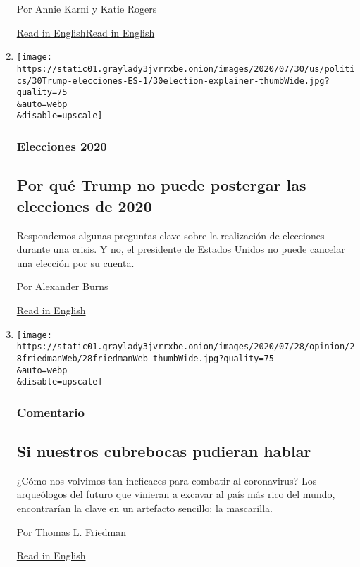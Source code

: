 \begin{enumerate}
  Por Annie Karni y Katie Rogers

  \href{https://www.nytimes3xbfgragh.onion/2020/07/28/us/politics/donald-fred-trump.html}{Read
  in
  English}\href{https://www.nytimes3xbfgragh.onion/2020/07/28/us/politics/donald-fred-trump.html}{Read
  in English}
\item
  \href{/es/2020/07/30/espanol/estados-unidos/trump-retrasar-elecciones.html}{}

  \texttt{[image: https://static01.graylady3jvrrxbe.onion/images/2020/07/30/us/politics/30Trump-elecciones-ES-1/30election-explainer-thumbWide.jpg?quality=75\\\&auto=webp\\\&disable=upscale]}

  \hypertarget{elecciones-2020}{%
  \subsubsection{Elecciones 2020}\label{elecciones-2020}}

  \hypertarget{por-quuxe9-trump-no-puede-postergar-las-elecciones-de-2020}{%
  \subsection{Por qué Trump no puede postergar las elecciones de
  2020}\label{por-quuxe9-trump-no-puede-postergar-las-elecciones-de-2020}}

  Respondemos algunas preguntas clave sobre la realización de elecciones
  durante una crisis. Y no, el presidente de Estados Unidos no puede
  cancelar una elección por su cuenta.

  Por Alexander Burns

  \href{https://www.nytimes3xbfgragh.onion/2020/07/30/us/politics/trump-postpone-election.html}{Read
  in English}
\item
  \href{/es/2020/07/30/espanol/opinion/usar-cubrebocas-politica.html}{}

  \texttt{[image: https://static01.graylady3jvrrxbe.onion/images/2020/07/28/opinion/28friedmanWeb/28friedmanWeb-thumbWide.jpg?quality=75\\\&auto=webp\\\&disable=upscale]}

  \hypertarget{comentario-2}{%
  \subsubsection{Comentario}\label{comentario-2}}

  \hypertarget{si-nuestros-cubrebocas-pudieran-hablar}{%
  \subsection{Si nuestros cubrebocas pudieran
  hablar}\label{si-nuestros-cubrebocas-pudieran-hablar}}

  ¿Cómo nos volvimos tan ineficaces para combatir al coronavirus? Los
  arqueólogos del futuro que vinieran a excavar al país más rico del
  mundo, encontrarían la clave en un artefacto sencillo: la mascarilla.

  Por Thomas L. Friedman

  \href{https://www.nytimes3xbfgragh.onion/2020/07/28/opinion/coronavirus-masks.html}{Read
  in English}
\end{enumerate}

